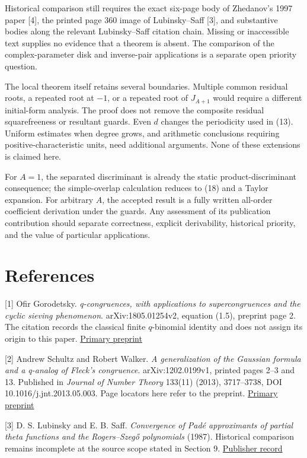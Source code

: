 \documentclass[
  11pt,
]{article}
\begin{document}
Historical comparison still requires the exact six-page body of
Zhedanov's 1997 paper {[}4{]}, the printed page 360 image of
Lubinsky--Saff {[}3{]}, and substantive bodies along the relevant
Lubinsky--Saff citation chain. Missing or inaccessible text supplies no
evidence that a theorem is absent. The comparison of the
complex-parameter disk and inverse-pair applications is a separate open
priority question.

The local theorem itself retains several boundaries. Multiple common
residual roots, a repeated root at \(-1\), or a repeated root of
\(J_{A+1}\) would require a different initial-form analysis. The proof
does not remove the composite residual squarefreeness or resultant
guards. Even \(d\) changes the periodicity used in (13). Uniform
estimates when degree grows, and arithmetic conclusions requiring
positive-characteristic units, need additional arguments. None of these
extensions is claimed here.

For \(A=1\), the separated discriminant is already the static
product-discriminant consequence; the simple-overlap calculation reduces
to (18) and a Taylor expansion. For arbitrary \(A\), the accepted result
is a fully written all-order coefficient derivation under the guards.
Any assessment of its publication contribution should separate
correctness, explicit derivability, historical priority, and the value
of particular applications.

\section{References}\label{references}

{[}1{]} Ofir Gorodetsky. \emph{q-congruences, with applications to
supercongruences and the cyclic sieving phenomenon}. arXiv:1805.01254v2,
equation (1.5), preprint page 2. The citation records the classical
finite \(q\)-binomial identity and does not assign its origin to this
paper. \href{https://arxiv.org/pdf/1805.01254v2}{Primary preprint}

{[}2{]} Andrew Schultz and Robert Walker. \emph{A generalization of the
Gaussian formula and a q-analog of Fleck's congruence}.
arXiv:1202.0199v1, printed pages 2--3 and 13. Published in \emph{Journal
of Number Theory} 133(11) (2013), 3717--3738, DOI
10.1016/j.jnt.2013.05.003. Page locators here refer to the preprint.
\href{https://arxiv.org/pdf/1202.0199v1}{Primary preprint}

{[}3{]} D. S. Lubinsky and E. B. Saff. \emph{Convergence of Padé
approximants of partial theta functions and the Rogers--Szegő
polynomials} (1987). Historical comparison remains incomplete at the
source scope stated in Section 9.
\href{https://doi.org/10.1007/BF01890574}{Publisher record}
\end{document}
